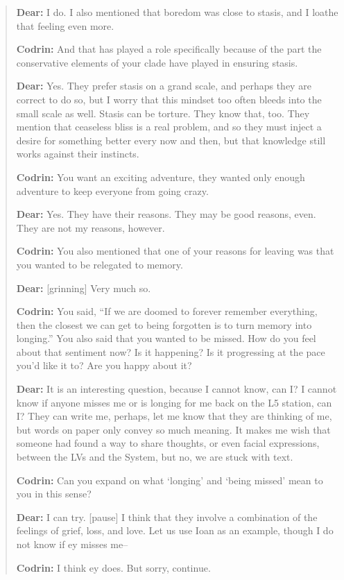 \begin{quote}
\textbf{Dear:} I do. I also mentioned that boredom was close to stasis, and I loathe that feeling even more.

\textbf{Codrin:} And that has played a role specifically because of the part the conservative elements of your clade have played in ensuring stasis.

\textbf{Dear:} Yes. They prefer stasis on a grand scale, and perhaps they are correct to do so, but I worry that this mindset too often bleeds into the small scale as well. Stasis can be torture. They know that, too. They mention that ceaseless bliss is a real problem, and so they must inject a desire for something better every now and then, but that knowledge still works against their instincts.

\textbf{Codrin:} You want an exciting adventure, they wanted only enough adventure to keep everyone from going crazy.

\textbf{Dear:} Yes. They have their reasons. They may be good reasons, even. They are not my reasons, however.

\textbf{Codrin:} You also mentioned that one of your reasons for leaving was that you wanted to be relegated to memory.

\textbf{Dear:} {[}grinning{]} Very much so.

\textbf{Codrin:} You said, ``If we are doomed to forever remember everything, then the closest we can get to being forgotten is to turn memory into longing.'' You also said that you wanted to be missed. How do you feel about that sentiment now? Is it happening? Is it progressing at the pace you'd like it to? Are you happy about it?

\textbf{Dear:} It is an interesting question, because I cannot know, can I? I cannot know if anyone misses me or is longing for me back on the L5 station, can I? They can write me, perhaps, let me know that they are thinking of me, but words on paper only convey so much meaning. It makes me wish that someone had found a way to share thoughts, or even facial expressions, between the LVs and the System, but no, we are stuck with text.

\textbf{Codrin:} Can you expand on what `longing' and `being missed' mean to you in this sense?

\textbf{Dear:} I can try. {[}pause{]} I think that they involve a combination of the feelings of grief, loss, and love. Let us use Ioan as an example, though I do not know if ey misses me--

\textbf{Codrin:} I think ey does. But sorry, continue.


\end{quote}
